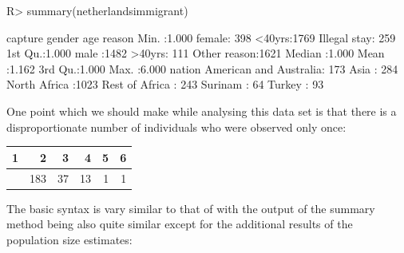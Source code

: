 \documentclass[
]{jss}
\newcommand{\1}{\mathcal{I}} \newcommand{\bZero}{\boldsymbol{0}}
\begin{document}
\begin{CodeChunk}
\begin{CodeInput}
R> summary(netherlandsimmigrant)
\end{CodeInput}
\begin{CodeOutput}
    capture         gender         age                reason    
 Min.   :1.000   female: 398   <40yrs:1769   Illegal stay: 259  
 1st Qu.:1.000   male  :1482   >40yrs: 111   Other reason:1621  
 Median :1.000                                                  
 Mean   :1.162                                                  
 3rd Qu.:1.000                                                  
 Max.   :6.000                                                  
                    nation    
 American and Australia: 173  
 Asia                  : 284  
 North Africa          :1023  
 Rest of Africa        : 243  
 Surinam               :  64  
 Turkey                :  93  
\end{CodeOutput}
\end{CodeChunk}

One point which we should make while analysing this data set is that
there is a disproportionate number of individuals who were observed only
once:


\begin{longtable}[]{@{}rrrrrr@{}}
\toprule\noalign{}
1 & 2 & 3 & 4 & 5 & 6 \\
\midrule\noalign{}
\endhead
\bottomrule\noalign{}
\endlastfoot
1645 & 183 & 37 & 13 & 1 & 1 \\
\end{longtable}

The basic syntax is vary similar to that of  with the output
of the summary method being also quite similar except for the additional
results of the population size estimates:
\end{document}
